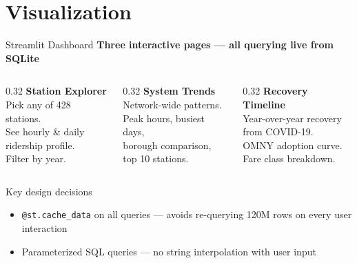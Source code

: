 \documentclass{beamer}
\begin{document}
	\section{Visualization}
	
	\begin{frame}{Streamlit Dashboard}
		\textbf{Three interactive pages — all querying live from SQLite}\\
		\vspace{0.4cm}
		\begin{columns}[T]
			\begin{column}{0.32\textwidth}
				\centering
				\textcolor{accentBlue}{\textbf{Station Explorer}}\\
				\vspace{0.2cm}
				\small
				Pick any of 428 stations.\\
				See hourly \& daily\\
				ridership profile.\\
				Filter by year.
			\end{column}
			\begin{column}{0.32\textwidth}
				\centering
				\textcolor{mtaRed}{\textbf{System Trends}}\\
				\vspace{0.2cm}
				\small
				Network-wide patterns.\\
				Peak hours, busiest days,\\
				borough comparison,\\
				top 10 stations.
			\end{column}
			\begin{column}{0.32\textwidth}
				\centering
				\textcolor{mtaGreen}{\textbf{Recovery Timeline}}\\
				\vspace{0.2cm}
				\small
				Year-over-year recovery\\
				from COVID-19.\\
				OMNY adoption curve.\\
				Fare class breakdown.
			\end{column}
		\end{columns}
		\vspace{0.5cm}
		\begin{block}{Key design decisions}
			\begin{itemize}
				\item \texttt{@st.cache\_data} on all queries — avoids re-querying
				120M rows on every user interaction
				\item Parameterized SQL queries — no string interpolation with
				user input
			\end{itemize}
		\end{block}
	\end{frame}
	
\end{document}
